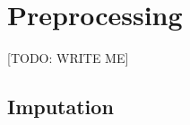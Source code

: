 \documentclass{article} %
\begin{document}



\section{Preprocessing}
\label{sec:preprocessing}

[TODO: WRITE ME]


\subsection{Imputation}
\label{sec:imputation}
\end{document}
